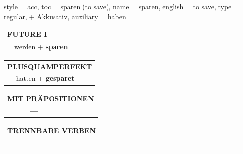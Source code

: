 \begin{verbentry}{
  style = {acc},
  toc = {sparen (to save)},
  name = {sparen},
  english = {to save},
  type = {regular, + Akkusativ},
  auxiliary = {haben}
}
\begin{tabular}{rl}
    \multicolumn{2}{l}{\textbf{FUTURE I} }\\
  &  werden + \textbf{sparen}\\
 
  \end{tabular}
\hfill
   \begin{tabular}{rl}
      \multicolumn{2}{l}{\textbf{PLUSQUAMPERFEKT}}\\
  &  hatten + \textbf{gesparet}\\
  \end{tabular}
  
  
\vspace{10pt}

\begin{tabular}{lll}
\multicolumn{3}{l}{\textbf{MIT PRÄPOSITIONEN}}\\
& \textbf{---} & \\
\end{tabular}
\hfill
\begin{tabular}{lll}
\multicolumn{3}{l}{\textbf{TRENNBARE VERBEN}}\\
& \textbf{---} & \\
\end{tabular}
\vspace{-5pt}
\end{verbentry}


